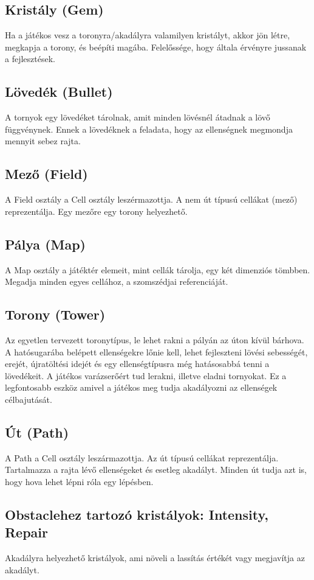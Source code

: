 \subsection{Kristály (Gem)}
	Ha a játékos vesz a toronyra/akadályra valamilyen kristályt, akkor jön létre, megkapja a torony, és beépíti magába. Felelőssége, hogy általa érvényre jussanak a fejlesztések.
\subsection{Lövedék (Bullet)}
	A tornyok egy lövedéket tárolnak, amit minden lövésnél átadnak a lövő függvénynek. Ennek a lövedéknek a feladata, hogy az ellenségnek megmondja mennyit sebez rajta.
\subsection{Mező (Field)}
A Field osztály a Cell osztály leszérmazottja. A nem út típusú cellákat (mező) reprezentálja. Egy mezőre egy torony helyezhető. 

\subsection{Pálya (Map)}
A Map osztály a játéktér elemeit, mint cellák tárolja, egy két dimenziós tömbben. Megadja minden egyes cellához, a szomszédjai referenciáját. 




\subsection{Torony (Tower)}
	Az egyetlen tervezett toronytípus, le lehet rakni a pályán az úton kívül bárhova. A hatósugarába belépett ellenségekre lőnie kell, lehet fejleszteni lövési sebességét, erejét, újratöltési idejét és egy ellenségtípusra még hatásosabbá tenni a lövedékeit. A játékos varázserőért tud lerakni, illetve eladni tornyokat. Ez a legfontosabb eszköz amivel a játékos meg tudja akadályozni az ellenségek célbajutását.
\subsection{Út (Path)}
A Path a Cell osztály leszármazottja. Az út típusú cellákat reprezentálja. Tartalmazza a rajta lévő ellenségeket és esetleg akadályt. Minden út tudja azt is, hogy hova lehet lépni róla egy lépésben.

\subsection{Obstaclehez tartozó kristályok: Intensity, Repair}
Akadályra helyezhető kristályok, ami növeli a lassítás értékét vagy megjavítja az akadályt.

